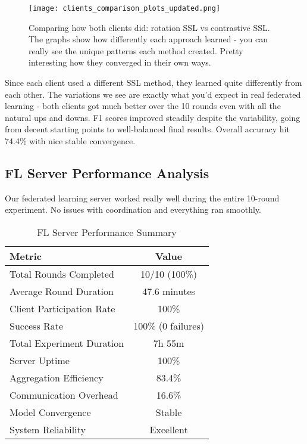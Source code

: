 \documentclass[a4paper, 10 pt, conference]{ieeeconf}
\begin{document}
\begin{figure*}[!htbp]
\centering
\texttt{[image: clients\_comparison\_plots\_updated.png]}
\caption{Comparing how both clients did: rotation SSL vs contrastive SSL. The graphs show how differently each approach learned - you can really see the unique patterns each method created. Pretty interesting how they converged in their own ways.}
\label{fig:clients_comparison}
\end{figure*}

Since each client used a different SSL method, they learned quite differently from each other. The variations we see are exactly what you'd expect in real federated learning - both clients got much better over the 10 rounds even with all the natural ups and downs. F1 scores improved steadily despite the variability, going from decent starting points to well-balanced final results. Overall accuracy hit 74.4\% with nice stable convergence.

\subsection{FL Server Performance Analysis}

Our federated learning server worked really well during the entire 10-round experiment. No issues with coordination and everything ran smoothly.

\begin{table}[!htbp]
\centering
\caption{FL Server Performance Summary}
\label{tab:server_performance}
\small
\begin{tabular}{|l|c|}
\hline
\textbf{Metric} & \textbf{Value} \\
\hline
Total Rounds Completed & 10/10 (100\%) \\
Average Round Duration & 47.6 minutes \\
Client Participation Rate & 100\% \\
Success Rate & 100\% (0 failures) \\
Total Experiment Duration & 7h 55m \\
Server Uptime & 100\% \\
Aggregation Efficiency & 83.4\% \\
Communication Overhead & 16.6\% \\
Model Convergence & Stable \\
System Reliability & Excellent \\
\hline
\end{tabular}
\end{table}
\end{document}
